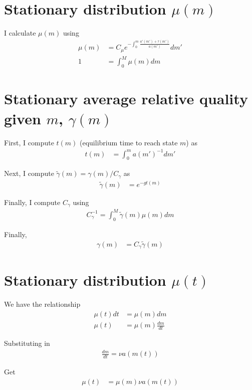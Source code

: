 \documentclass[11pt,english]{article}
\theoremstyle{remark}
\begin{document}
\section{Stationary distribution $\mu(m)$}

I calculate $\mu(m)$ using 
\begin{align*}
	\mu(m) &= C_{\mu} e^{-\int_0^m \frac{a'(m') + \tau(m')}{a(m')}}dm' \\
	1 &= \int_0^{M} \mu(m)dm
\end{align*}

\section{Stationary average relative quality given $m$, $\gamma(m)$}

First, I compute $t(m)$ (equilibrium time to reach state $m$) as 
\begin{align*}
t(m) &= \int_0^m a(m')^{-1} dm' 
\end{align*}

Next, I compute $\tilde{\gamma}(m) = \gamma(m) / C_{\gamma}$ as 
\begin{align*}
	\tilde{\gamma}(m) &= e^{-gt(m)}
\end{align*}

Finally, I compute $C_{\gamma}$ using 
\begin{align*}
	C_{\gamma}^{-1} = \int_0^{M} \tilde{\gamma}(m) \mu(m) dm
\end{align*}

Finally, 
\begin{align*}
	\gamma(m) &= C_{\gamma} \tilde{\gamma}(m) 
\end{align*}

\section{Stationary distribution $\mu(t)$}

We have the relationship
\begin{align*}
\mu(t)dt &= \mu(m)dm \\
\mu(t) &= \mu(m) \frac{dm}{dt}
\end{align*}

Substituting in
\begin{align*}
\frac{dm}{dt} = \nu a(m(t))
\end{align*}

Get 
\begin{align*}
\mu(t) &= \mu(m) \nu a(m(t))
\end{align*}
\end{document}

